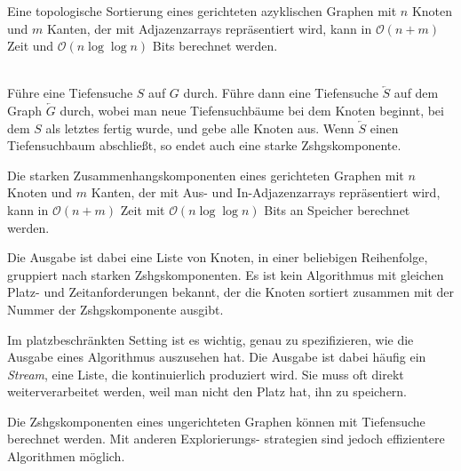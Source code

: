 \documentclass{cheat-sheet}
\renewcommand{\O}{\mathcal{O}} %
\begin{document}
\begin{kor}
  Eine topologische Sortierung eines gerichteten azyklischen Graphen mit $n$ Knoten und $m$ Kanten, der mit Adjazenzarrays repräsentiert wird, kann in $\O(n + m)$ Zeit und $\O(n \log \log n)$ Bits berechnet werden.
\end{kor}



\begin{alg} \mbox{}\\
  Führe eine Tiefensuche $S$ auf $G$ durch.
  Führe dann eine Tiefensuche $\overleftarrow{S}$ auf dem Graph $\overleftarrow{G}$ durch, wobei man neue Tiefensuchbäume bei dem Knoten beginnt, bei dem $S$ als letztes fertig wurde, und gebe alle Knoten aus.
  Wenn $\overleftarrow{S}$ einen Tiefensuchbaum abschließt, so endet auch eine starke Zshgskomponente.
\end{alg}

\begin{thm}
  Die starken Zusammenhangskomponenten eines gerichteten Graphen mit $n$ Knoten und $m$ Kanten, der mit Aus- und In-Adjazenzarrays repräsentiert wird, kann in $\O(n + m)$ Zeit mit $\O(n \log \log n)$ Bits an Speicher berechnet werden.
\end{thm}

\begin{bem}
  Die Ausgabe ist dabei eine Liste von Knoten, in einer beliebigen Reihenfolge, gruppiert nach starken Zshgskomponenten.
  Es ist kein Algorithmus mit gleichen Platz- und Zeitanforderungen bekannt, der die Knoten sortiert zusammen mit der Nummer der Zshgskomponente ausgibt.
\end{bem}


\begin{folgerung}
  Im platzbeschränkten Setting ist es wichtig, genau zu spezifizieren, wie die Ausgabe eines Algorithmus auszusehen hat.
  Die Ausgabe ist dabei häufig ein \textit{Stream}, eine Liste, die kontinuierlich produziert wird.
  Sie muss oft direkt weiterverarbeitet werden, weil man nicht den Platz hat, ihn zu speichern.
\end{folgerung}


\begin{bem}
  Die Zshgskomponenten eines ungerichteten Graphen können mit Tiefensuche berechnet werden.
  Mit anderen Explorierungs- strategien sind jedoch effizientere Algorithmen möglich.
\end{bem}
\end{document}
